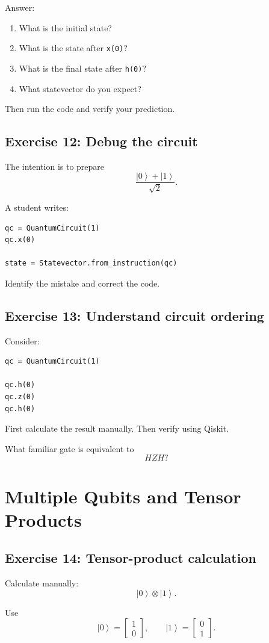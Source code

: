 \documentclass[12pt,a4paper]{article}
\newcommand{\ket}[1]{\left|#1\right\rangle}
\begin{document}
Answer:
\begin{enumerate}
    \item What is the initial state?
    \item What is the state after \texttt{x(0)}?
    \item What is the final state after \texttt{h(0)}?
    \item What statevector do you expect?
\end{enumerate}

Then run the code and verify your prediction.

\subsection*{Exercise 12: Debug the circuit}
The intention is to prepare
\[
\frac{\ket{0}+\ket{1}}{\sqrt{2}}.
\]

A student writes:
\begin{lstlisting}
qc = QuantumCircuit(1)
qc.x(0)

state = Statevector.from_instruction(qc)
\end{lstlisting}

Identify the mistake and correct the code.

\subsection*{Exercise 13: Understand circuit ordering}
Consider:
\begin{lstlisting}
qc = QuantumCircuit(1)

qc.h(0)
qc.z(0)
qc.h(0)
\end{lstlisting}

First calculate the result manually. Then verify using Qiskit.

What familiar gate is equivalent to
\[
HZH?
\]

\section{Multiple Qubits and Tensor Products}

\subsection*{Exercise 14: Tensor-product calculation}
Calculate manually:
\[
\ket{0}\otimes\ket{1}.
\]

Use
\[
\ket{0}=
\begin{bmatrix}
1\\
0
\end{bmatrix},
\qquad
\ket{1}=
\begin{bmatrix}
0\\
1
\end{bmatrix}.
\]
\end{document}

